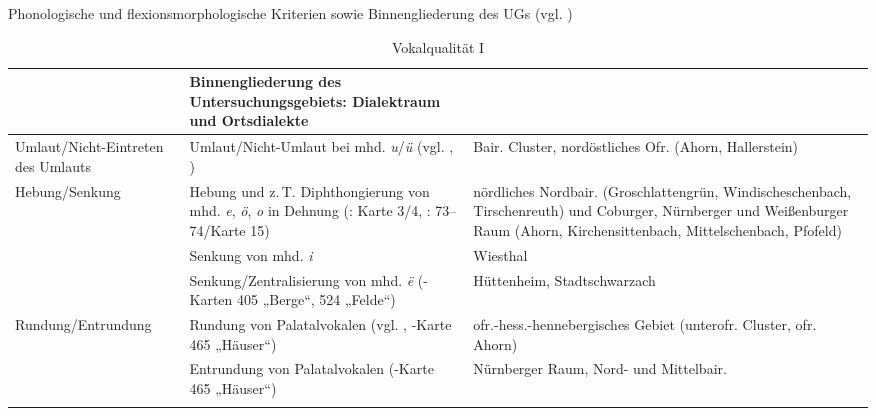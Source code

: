 \begin{table}
\caption{Phonologische und flexionsmorphologische Kriterien sowie Binnengliederung des UGs (vgl. \citealt[4--5]{Rowley1997})\label{tab:12}}

\begin{subtable}{\textwidth}
\caption{Vokalqualität I\label{tab:12a}}
\small
\begin{tabularx}{\textwidth}{>{\raggedright\arraybackslash}p{}QQ}
\lsptoprule

 & Binnengliederung des Untersuchungs\-gebiets: Dialektraum und Ortsdialekte\\
\midrule
Umlaut\slash Nicht-Eintreten des Umlauts & Umlaut/Nicht-Umlaut bei mhd. \textit{u}/\textit{ü} (vgl. \citealt{Hinderling2004}, \citealt[159ff.]{SNOB1}) & Bair. Cluster, nordöstliches Ofr. (Ahorn, Hallerstein)\\
\tablevspace
Hebung\slash Senkung & Hebung und z.\,T. Diphthongierung von mhd. \textit{e}, \textit{ö}, \textit{o} in Dehnung (\citealt{Gütter1971}: Karte 3/4, \citealt{Rowley1997}: 73--74/Karte 15) & nördliches Nordbair. (Gro\-schlat\-ten\-grün, Windischeschenbach, Tir\-schen\-reuth) und Coburger, Nürnberger und Weißenburger Raum (Ahorn, Kirchensittenbach, Mittelschenbach, Pfofeld)\\
\tablevspace
& Senkung von mhd. \textit{i} & Wiesthal\\
\tablevspace
& Senkung\slash Zentralisierung von mhd. \textit{ë} (\citealt{WA}-Karten 405 „Berge“, 524 „Felde“) & Hüttenheim, Stadtschwarzach\\
\tablevspace
Rundung\slash Entrundung & Rundung von Palatalvokalen (vgl. \citealt[1103]{Wiesinger1983e}, \citealt{WA}-Karte 465 „Häuser“) & ofr.-hess.-hennebergisches Gebiet (unterofr. Cluster, ofr. Ahorn)\\
\tablevspace
& Entrundung von Palatalvokalen (\citealt{WA}-Karte 465 „Häuser“) & Nürnberger Raum, Nord- und Mittelbair.\\
\lspbottomrule
\end{tabularx}
\end{subtable}
\end{table}



